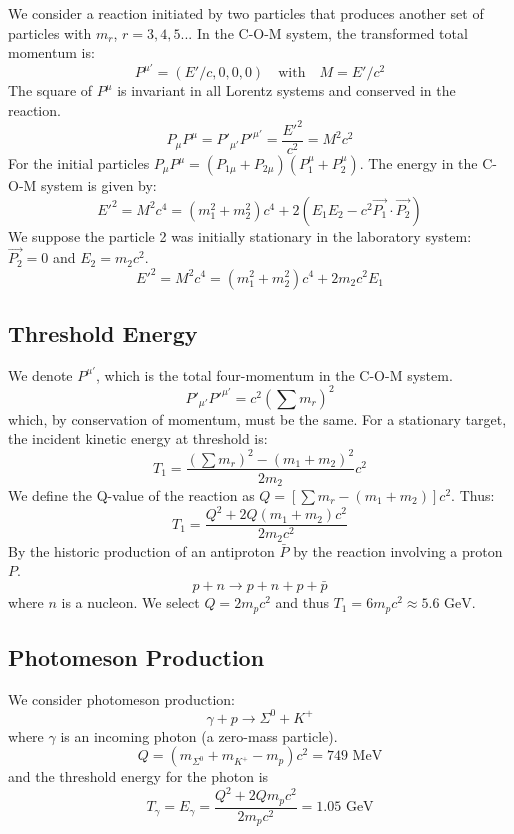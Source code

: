 \documentclass{article}
\begin{document}
    We consider a reaction initiated by two particles that produces another set of particles with $m_r$, $r=3,4,5...$ In the C-O-M system, the transformed total momentum is:
    $$ P^{\mu'} = (E'/c, 0, 0, 0) \quad \text{with} \quad M = E'/c^2 $$
    The square of $P^{\mu}$ is invariant in all Lorentz systems and conserved in the reaction.
    $$ P_\mu P^\mu = P'_{\mu'} P'^{\mu'} = \frac{E'^2}{c^2} = M^2 c^2 $$
    For the initial particles $P_\mu P^\mu = (P_{1\mu} + P_{2\mu})(P_1^\mu + P_2^\mu)$.
    The energy in the C-O-M system is given by:
    $$ E'^2 = M^2 c^4 = (m_1^2 + m_2^2)c^4 + 2(E_1 E_2 - c^2 \vec{P_1} \cdot \vec{P_2}) $$
    We suppose the particle 2 was initially stationary in the laboratory system: $\vec{P_2}=0$ and $E_2 = m_2 c^2$.
    $$ E'^2 = M^2 c^4 = (m_1^2 + m_2^2)c^4 + 2 m_2 c^2 E_1 $$
    
    \subsection*{ Threshold Energy}
    We denote $P^{\mu'}$, which is the total four-momentum in the C-O-M system.
    $$ P'_{\mu'} P'^{\mu'} = c^2 \left(\sum m_r\right)^2 $$
    which, by conservation of momentum, must be the same.
    For a stationary target, the incident kinetic energy at threshold is:
    $$ T_1 = \frac{(\sum m_r)^2 - (m_1+m_2)^2}{2m_2} c^2 $$
    We define the Q-value of the reaction as $Q = \left[\sum m_r - (m_1+m_2)\right]c^2$.
    Thus:
    $$ T_1 = \frac{Q^2 + 2Q(m_1+m_2)c^2}{2m_2c^2} $$
    By the historic production of an antiproton $\bar{P}$ by the reaction involving a proton $P$.
    $$ p+n \rightarrow p+n+p+\bar{p} $$
    where $n$ is a nucleon. We select $Q=2m_p c^2$ and thus $T_1 = 6m_p c^2 \approx 5.6 \text{ GeV}$.
    
    \subsection*{ Photomeson Production}
    We consider photomeson production:
    $$ \gamma + p \rightarrow \Sigma^0 + K^+ $$
    where $\gamma$ is an incoming photon (a zero-mass particle).
    $$ Q = (m_{\Sigma^0} + m_{K^+} - m_p)c^2 = 749 \text{ MeV} $$
    and the threshold energy for the photon is
    $$ T_\gamma = E_\gamma = \frac{Q^2 + 2Q m_p c^2}{2 m_p c^2} = 1.05 \text{ GeV} $$
    
\end{document}
